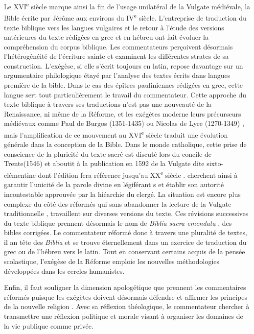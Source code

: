 \documentclass[11pt,french]{article}
\begin{document}
Le XVI\textsuperscript{e} siècle marque ainsi la fin de l'usage unilatéral de la Vulgate médiévale, la Bible écrite par Jérôme aux environs du IV\textsuperscript{e} siècle. L'entreprise de traduction du texte biblique vers les langues vulgaires et le retour à l'étude des versions antérieures du texte rédigées en grec et en hébreu ont fait évoluer la compréhension du corpus biblique. Les commentateurs perçoivent désormais l'hétérogénéité de l'écriture sainte et examinent les différentes strates de sa construction. L'exégèse, si elle s'écrit toujours en latin, repose davantage sur un argumentaire philologique étayé par l'analyse des textes écrits dans langues première de la bible. Dans le cas des épîtres pauliniennes rédigées en grec, cette langue sert tout particulièrement le travail du commentateur. Cette approche du texte biblique à travers ses traductions n'est pas une nouveauté de la Renaissance, ni même de la Réforme, et les exégètes moderne leurs précurseurs médiévaux comme Paul de Burgos (1351-1435) ou Nicolas de Lyre (1270-1349) \cite[p.~239]{dahanExtraitPrefaceBible2017}, mais l'amplification de ce mouvement au XVI\textsuperscript{e} siècle traduit une évolution générale dans la conception de la Bible.\linebreak
Dans le monde catholique, cette prise de conscience de la pluricité du texte sacré est discuté lors du concile de Trente(1546) et aboutit à la publication en 1592 de la Vulgate dite sixto-clémentine dont l'édition fera référence jusqu'au XX\textsuperscript{e} siècle \cite[p.9-10]{dahanVulgateAuXVIe2020}. cherchent ainsi à garantir l'unicité de la parole divine en légiférant s et établir son autorité incontestable approuvée par la hiéarchie du clergé. La situation est encore plus complexe du côté des réformés qui sans abandonner la lecture de la Vulgate traditionnelle , travaillent sur diverses versions du texte. Ces révisions successives du texte biblique prennent désormais le nom de \textit{Biblia sacra emendata} \cite[p.127]{noblesse-rocherRevisionsVulgateDans2020}, des bibles corrigées. Le commentateur réformé donc à  travers une pluralité de textes, il an tête des \textit{Biblia} et se trouve éternellement dans un exercice de traduction du grec ou de l'hébreu vers le latin. Tout en conservant certains acquis de la pensée scolastique, l'exégèse de la Réforme emploie les nouvelles méthodologies développées dans les cercles humanistes.\par
Enfin, il faut souligner la dimension apologétique que prennent les commentaires réformés puisque les exégètes doivent désormais défendre et affirmer les principes de la nouvelle religion \cite{boisson2012apologies}. Avec sa réflexion théologique, le commentateur chercher à transmettre une réflexion politique et morale visant à organiser les domaines de la vie publique comme privée.\par   
\end{document}
